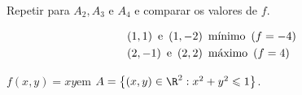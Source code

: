 \documentclass[11pt, oneside, a4paper]{gsm-l}
\begin{document}
\begin{sol}
Repetir para $A_2, A_3$ e $A_4$ e comparar os valores de $f$.

\[
\begin{gathered}
      \left( {1,1} \right){\text{ e }}\left( {1, - 2} \right){\text{ mínimo }}\left( {f =  - 4} \right) \hfill \\
      \left( {2, - 1} \right){\text{ e }}\left( {2,2} \right){\text{ máximo }}\left( {f = 4} \right) \hfill \\
\end{gathered}
\]

\end{sol}

\begin{exem}
    $f\left( {x,y} \right) = xy$em $A = \left\{ {\left( {x,y} \right) \in \R^2 :x^2  + y^2  \leqslant 1} \right\}$.
\end{exem}
\end{document}
